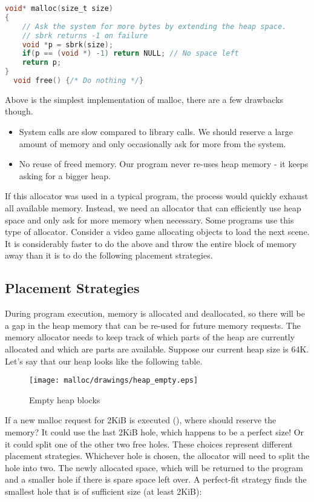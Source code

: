 \begin{lstlisting}[language=C]
void* malloc(size_t size)
{
    // Ask the system for more bytes by extending the heap space.
    // sbrk returns -1 on failure
    void *p = sbrk(size);
    if(p == (void *) -1) return NULL; // No space left
    return p;
}
  void free() {/* Do nothing */}
\end{lstlisting}

Above is the simplest implementation of malloc, there are a few drawbacks though.

\begin{itemize}
\item System calls are slow compared to library calls.
  We should reserve a large amount of memory and only occasionally ask for more from the system.
\item No reuse of freed memory.
  Our program never re-uses heap memory - it keeps asking for a bigger heap.
\end{itemize}

If this allocator was used in a typical program, the process would quickly exhaust all available memory.
Instead, we need an allocator that can efficiently use heap space and only ask for more memory when necessary.
Some programs use this type of allocator.
Consider a video game allocating objects to load the next scene.
It is considerably faster to do the above and throw the entire block of memory away than it is to do the following placement strategies.

\subsection{Placement Strategies}

During program execution, memory is allocated and deallocated, so there will be a gap in the heap memory that can be re-used for future memory requests.
The memory allocator needs to keep track of which parts of the heap are currently allocated and which are parts are available.
Suppose our current heap size is 64K.
Let's say that our heap looks like the following table.

\begin{figure}[H]
\centering
\texttt{[image: malloc/drawings/heap\_empty.eps]}
\caption{Empty heap blocks}
\end{figure}

If a new malloc request for 2KiB is executed (), where should  reserve the memory?
It could use the last 2KiB hole, which happens to be a perfect size!
Or it could split one of the other two free holes.
These choices represent different placement strategies.
Whichever hole is chosen, the allocator will need to split the hole into two.
The newly allocated space, which will be returned to the program and a smaller hole if there is spare space left over.
A perfect-fit strategy finds the smallest hole that is of sufficient size (at least 2KiB):

